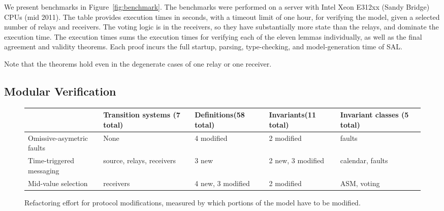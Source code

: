 \documentclass{llncs/llncs}
\newcommand{\lee}[1]{ } %
\newcommand{\lee}[1]{ {\color{blue}$<$lee: #1$>$} } %
\begin{document}
We present benchmarks in Figure~\ref{fig:benchmark}. The benchmarks were
performed on a server with Intel Xeon E312xx (Sandy Bridge) CPUs (mid 2011). The table provides execution times in seconds, with a timeout limit of one hour, for verifying the model, given a selected number of relays and receivers. The voting logic is in the receivers, so they have substantially more state than the relays, and dominate the execution time. The execution times sums the execution times for verifying each of the eleven lemmas individually, as well as the final agreement and validity theorems. Each proof incurs the full startup, parsing, type-checking, and model-generation time of SAL.

Note that the theorems hold even in the degenerate cases of one relay or one receiver.

\lee{Ben: can you run a couple of representative examples of Rushby's model, say for 5 and 6 receivers?}



\subsection{Modular Verification}\label{sec:modular}

\begin{figure}
  \centering
  \begin{tabular}{|p{2.25cm}|p{2.25cm}|p{2.25cm}|p{2.25cm}|p{2.25cm}|}
  \hline
                                  & Transition systems (7 total)  &Definitions\linebreak (58 total) & Invariants\linebreak (11 total) & Invariant classes (5 total) \\
  \hline \hline
  Omissive-asymetric faults       & None                & 4 modified & 2 modified & faults             \\
  \hline
  Time-triggered messaging        & source, relays, receivers & 3 new      & 2 new, 3 modified & calendar, faults \\
  \hline
          Mid-value selection             & receivers         & 4 new, 3 modified & 2 modified & ASM, voting \\
  \hline
  \end{tabular}
  \caption{Refactoring effort for protocol modifications, measured by which portions of the model have to be modified.}
  \label{fig:effort}
\end{figure}
\end{document}
